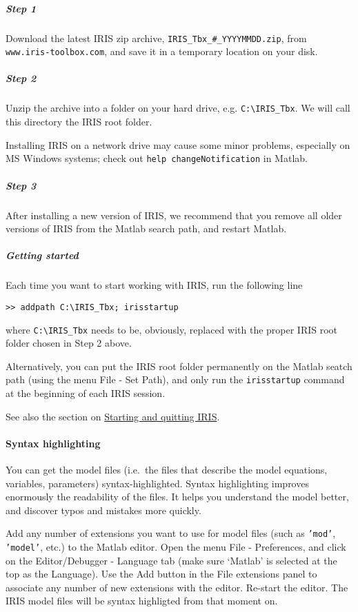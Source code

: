 \subparagraph{Step 1}\label{step-1}

Download the latest IRIS zip archive,
\texttt{IRIS\_Tbx\_\#\_YYYYMMDD.zip}, from
\texttt{www.iris-toolbox.com}, and save it in a temporary location on
your disk.

\subparagraph{Step 2}\label{step-2}

Unzip the archive into a folder on your hard drive, e.g.
\texttt{C:\textbackslash{}IRIS\_Tbx}. We will call this directory the
IRIS root folder.

Installing IRIS on a network drive may cause some minor problems,
especially on MS Windows systems; check out
\texttt{help changeNotification} in Matlab.

\subparagraph{Step 3}\label{step-3}

After installing a new version of IRIS, we recommend that you remove all
older versions of IRIS from the Matlab search path, and restart Matlab.

\subparagraph{Getting started}\label{getting-started}

Each time you want to start working with IRIS, run the following line

\begin{verbatim}
>> addpath C:\IRIS_Tbx; irisstartup
\end{verbatim}

where \texttt{C:\textbackslash{}IRIS\_Tbx} needs to be, obviously,
replaced with the proper IRIS root folder chosen in Step 2 above.

Alternatively, you can put the IRIS root folder permanently on the
Matlab seatch path (using the menu File - Set Path), and only run the
\texttt{irisstartup} command at the beginning of each IRIS session.

See also the section on \href{config/Contents}{Starting and quitting
IRIS}.

\paragraph{Syntax highlighting}\label{syntax-highlighting}

You can get the model files (i.e.~the files that describe the model
equations, variables, parameters) syntax-highlighted. Syntax
highlighting improves enormously the readability of the files. It helps
you understand the model better, and discover typos and mistakes more
quickly.

Add any number of extensions you want to use for model files (such as
\texttt{'mod'}, \texttt{'model'}, etc.) to the Matlab editor. Open the
menu File - Preferences, and click on the Editor/Debugger - Language tab
(make sure `Matlab' is selected at the top as the Language). Use the Add
button in the File extensions panel to associate any number of new
extensions with the editor. Re-start the editor. The IRIS model files
will be syntax highligted from that moment on.



